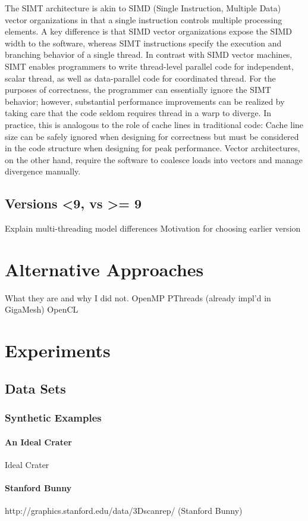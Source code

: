 \documentclass{article}
\begin{document}
The SIMT architecture is akin to SIMD (Single Instruction, Multiple Data) vector organizations in that a single instruction controls multiple processing elements. A key difference is that SIMD vector organizations expose the SIMD width to the software, whereas SIMT instructions specify the execution and branching behavior of a single thread. In contrast with SIMD vector machines, SIMT enables programmers to write thread-level parallel code for independent, scalar thread, as well as data-parallel code for coordinated thread. For the purposes of correctness, the programmer can essentially ignore the SIMT behavior; however, substantial performance improvements can be realized by taking care that the code seldom requires thread in a warp to diverge. In practice, this is analogous to the role of cache lines in traditional code: Cache line size can be safely ignored when designing for correctness but must be considered in the code structure when designing for peak performance. Vector architectures, on the other hand, require the software to coalesce loads into vectors and manage divergence manually.
\subsection{Versions <9, vs >= 9}
Explain multi-threading model differences
Motivation for choosing earlier version
\section{Alternative Approaches}
	What they are
and why I did not.
OpenMP
PThreads
(already impl’d in GigaMesh)
OpenCL
\section{Experiments}
\subsection{Data Sets}
\subsubsection{Synthetic Examples}
\paragraph{An Ideal Crater}
Ideal Crater
\paragraph{Stanford Bunny}
http://graphics.stanford.edu/data/3Dscanrep/ (Stanford Bunny)
\end{document}
